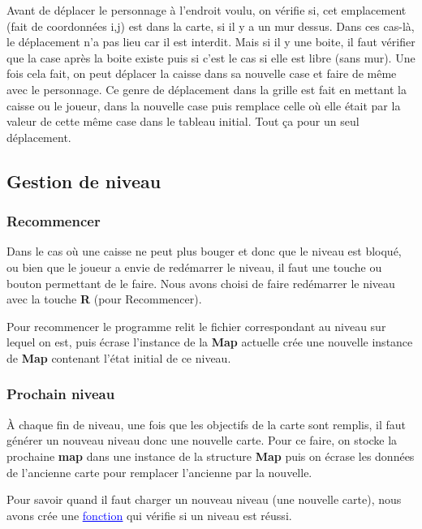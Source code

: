 \documentclass[french, 12pt]{article}
\begin{document}
       Avant de déplacer le personnage à l'endroit voulu, on vérifie si, cet emplacement (fait de coordonnées i,j) est dans la carte, si il y a un mur dessus. Dans ces cas-là, le déplacement n'a pas lieu car il est interdit. Mais si il y une boite, il faut vérifier que la case après la boite existe puis si c'est le cas si elle est libre (sans mur). Une fois cela fait, on peut déplacer la caisse dans sa nouvelle case et faire de même avec le personnage. Ce genre de déplacement dans la grille est fait en mettant la caisse ou le joueur, dans la nouvelle case puis remplace celle où elle était par la valeur de cette même case dans le tableau initial.
       Tout ça pour un seul déplacement.


   \subsection{Gestion de niveau}
       \subsubsection{Recommencer}
       Dans le cas où une caisse ne peut plus bouger et donc que le niveau est bloqué, ou bien que le joueur a envie de redémarrer le niveau, il faut une touche ou bouton permettant de le faire.
       Nous avons choisi de faire redémarrer le niveau avec la touche \textbf{R} (pour Recommencer).

       Pour recommencer le programme relit le fichier correspondant au niveau sur lequel on est, puis écrase l'instance de la \textbf{Map} actuelle crée une nouvelle instance de \textbf{Map} contenant l'état initial de ce niveau.


       \subsubsection{Prochain niveau}


       À chaque fin de niveau, une fois que les objectifs de la carte sont remplis, il faut générer un nouveau niveau donc une nouvelle carte.
       Pour ce faire, on stocke la prochaine \textbf{map} dans une instance de la structure \textbf{Map} puis on écrase les données de l'ancienne carte pour remplacer l'ancienne par la nouvelle.

       Pour savoir quand il faut charger un nouveau niveau (une nouvelle carte), nous avons crée une \href{../doc/html/move_8h.html}{\textcolor{blue}{\underline{fonction}}} qui vérifie si un niveau est réussi.
\end{document}
